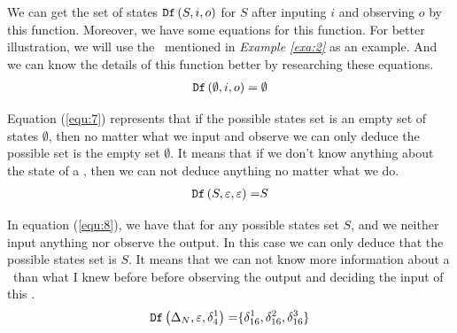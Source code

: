  
 We can get the set of states ${\tt Df}\left(S, i, o\right)$ for $S$ after inputing $i$ and observing $o$ by this function. Moreover, we have some equations for this function. For better illustration, we will use the \BCN\ mentioned in {\em Example \ref{exa:2}} as an example. And we can know the details of this function better by researching these equations.
\begin{equation}
\begin{split}
{\tt Df}\left(\emptyset,i,o\right)=\emptyset\\
\end{split}
\label{equ:7}
\end{equation}

Equation (\ref{equ:7}) represents that if the possible states set is an empty set of states $\emptyset$, then no matter what we input and observe we can only deduce the possible set is the empty set $\emptyset$. It means that if we don't know anything about the state of a \BCN, then we can not deduce anything no matter what we do.
\begin{equation}
\begin{split}
{\tt Df}\left(S,\varepsilon,\varepsilon\right)=&S\\
\end{split}
\label{equ:8}
\end{equation}

 In equation (\ref{equ:8}), we have that for any possible states set $S$, and we neither input anything nor observe the output. In this case we can only deduce that the possible states set is $S$. It means that we can not know more information about a \BCN\ than what I knew before before observing the output and deciding the input of this \BCN.
\begin{equation}
\begin{split}
{\tt Df}\left(\Delta_N,\varepsilon,\delta_4^1\right)=&\{\delta_{16}^1,\delta_{16}^2,\delta_{16}^3\}\\
\end{split}
\label{equ:9}
\end{equation}
 
